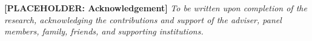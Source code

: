 \vspace{3\baselineskip}

\noindent \textbf{[PLACEHOLDER: Acknowledgement]} \textit{To be written upon completion of the research, acknowledging the contributions and support of the adviser, panel members, family, friends, and supporting institutions.}
